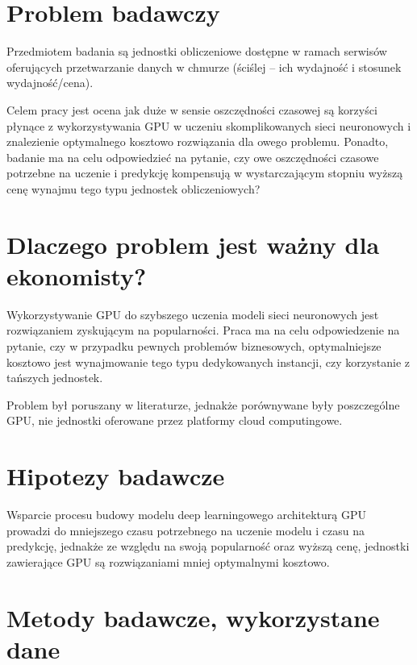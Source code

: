 \documentclass[12pt,a4paper,twoside]{article}
\begin{document}

\section{Problem badawczy}

Przedmiotem badania są jednostki obliczeniowe dostępne w ramach serwisów oferujących przetwarzanie danych w chmurze (ściślej – ich wydajność i stosunek wydajność/cena).

Celem pracy jest ocena jak duże w sensie oszczędności czasowej są korzyści płynące z wykorzystywania GPU w uczeniu skomplikowanych sieci neuronowych i znalezienie optymalnego kosztowo rozwiązania dla owego problemu. Ponadto, badanie ma na celu odpowiedzieć na pytanie, czy owe oszczędności czasowe potrzebne na uczenie i predykcję kompensują w wystarczającym stopniu wyższą cenę wynajmu tego typu jednostek obliczeniowych?


\section{Dlaczego problem jest ważny dla ekonomisty?}

Wykorzystywanie GPU do szybszego uczenia modeli sieci neuronowych jest rozwiązaniem zyskującym na popularności. Praca ma na celu odpowiedzenie na pytanie, czy w przypadku pewnych problemów biznesowych, optymalniejsze kosztowo jest wynajmowanie tego typu dedykowanych instancji, czy korzystanie z tańszych jednostek.

Problem był poruszany w literaturze, jednakże porównywane były poszczególne GPU, nie jednostki oferowane przez platformy cloud computingowe.


\section{Hipotezy badawcze}

Wsparcie procesu budowy modelu deep learningowego architekturą GPU prowadzi do mniejszego czasu potrzebnego na uczenie modelu i czasu na predykcję, jednakże ze względu na swoją popularność oraz wyższą cenę, jednostki zawierające GPU są rozwiązaniami mniej optymalnymi kosztowo.


\section{Metody badawcze, wykorzystane dane}
\end{document}
